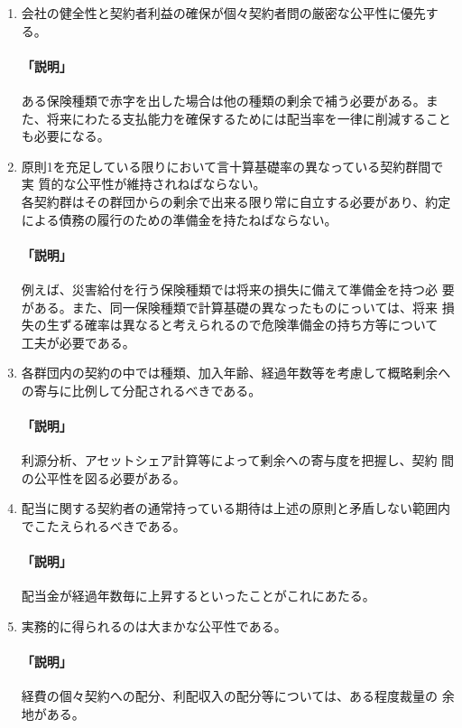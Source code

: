 \documentclass[report,gutter=10mm,fore-edge=10mm,uplatex,dvipdfmx]{jlreq}
\begin{document}
\begin{enumerate}[原則1.\ \ ]
 \item 
 会社の健全性と契約者利益の確保が個々契約者問の厳密な公平性に優先する。\\
 \paragraph{「説明」}
 ある保険種類で赤字を出した場合は他の種類の剰余で補う必要がある。ま
 た、将来にわたる支払能力を確保するためには配当率を一律に削減すること
 も必要になる。
 \item 
 原則1を充足している限りにおいて言十算基礎率の異なっている契約群間で実
 質的な公平性が維持されねばならない。\\
 各契約群はその群団からの剰余で出来る限り常に自立する必要があり、約定
 による債務の履行のための準備金を持たねばならない。
 \paragraph{「説明」}
 例えば、災害給付を行う保険種類では将来の損失に備えて準備金を持つ必
 要がある。また、同一保険種類で計算基礎の異なったものにっいては、将来
 損失の生ずる確率は異なると考えられるので危険準備金の持ち方等について
 工夫が必要である。
 \item 
 各群団内の契約の中では種類、加入年齢、経過年数等を考慮して概略剰余へ
 の寄与に比例して分配されるべきである。\\
 \paragraph{「説明」}
 利源分析、アセットシェア計算等によって剰余への寄与度を把握し、契約
 間の公平性を図る必要がある。
 \item 
 配当に関する契約者の通常持っている期待は上述の原則と矛盾しない範囲内
 でこたえられるべきである。
 \paragraph{「説明」}
 配当金が経過年数毎に上昇するといったことがこれにあたる。
 \item 
 実務的に得られるのは大まかな公平性である。
 \paragraph{「説明」}
 経費の個々契約への配分、利配収入の配分等については、ある程度裁量の
 余地がある。
\end{enumerate}
\end{document}
